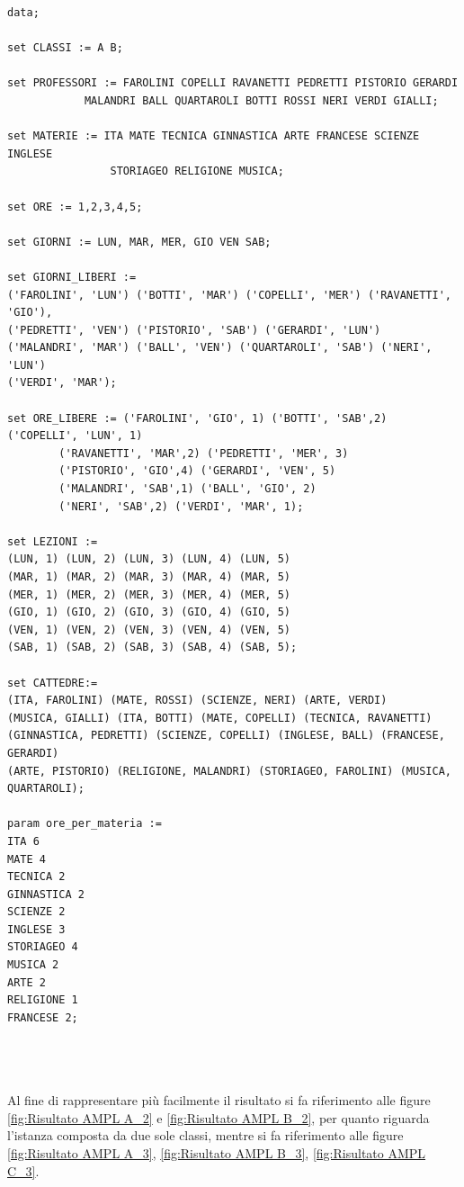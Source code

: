 \documentclass{article}
\begin{document}
\begin{verbatim}
data;

set CLASSI := A B;

set PROFESSORI := FAROLINI COPELLI RAVANETTI PEDRETTI PISTORIO GERARDI 
			MALANDRI BALL QUARTAROLI BOTTI ROSSI NERI VERDI GIALLI;
			
set MATERIE := ITA MATE TECNICA GINNASTICA ARTE FRANCESE SCIENZE INGLESE 
				STORIAGEO RELIGIONE MUSICA;
				
set ORE := 1,2,3,4,5;

set GIORNI := LUN, MAR, MER, GIO VEN SAB;

set GIORNI_LIBERI :=
('FAROLINI', 'LUN') ('BOTTI', 'MAR') ('COPELLI', 'MER') ('RAVANETTI', 'GIO'),
('PEDRETTI', 'VEN') ('PISTORIO', 'SAB') ('GERARDI', 'LUN')
('MALANDRI', 'MAR') ('BALL', 'VEN') ('QUARTAROLI', 'SAB') ('NERI', 'LUN')
('VERDI', 'MAR');

set ORE_LIBERE := ('FAROLINI', 'GIO', 1) ('BOTTI', 'SAB',2) ('COPELLI', 'LUN', 1)
        ('RAVANETTI', 'MAR',2) ('PEDRETTI', 'MER', 3)
        ('PISTORIO', 'GIO',4) ('GERARDI', 'VEN', 5) 
        ('MALANDRI', 'SAB',1) ('BALL', 'GIO', 2) 
        ('NERI', 'SAB',2) ('VERDI', 'MAR', 1);
        
set LEZIONI := 
(LUN, 1) (LUN, 2) (LUN, 3) (LUN, 4) (LUN, 5)
(MAR, 1) (MAR, 2) (MAR, 3) (MAR, 4) (MAR, 5)
(MER, 1) (MER, 2) (MER, 3) (MER, 4) (MER, 5)
(GIO, 1) (GIO, 2) (GIO, 3) (GIO, 4) (GIO, 5)
(VEN, 1) (VEN, 2) (VEN, 3) (VEN, 4) (VEN, 5) 
(SAB, 1) (SAB, 2) (SAB, 3) (SAB, 4) (SAB, 5);

set CATTEDRE:=
(ITA, FAROLINI) (MATE, ROSSI) (SCIENZE, NERI) (ARTE, VERDI)
(MUSICA, GIALLI) (ITA, BOTTI) (MATE, COPELLI) (TECNICA, RAVANETTI)
(GINNASTICA, PEDRETTI) (SCIENZE, COPELLI) (INGLESE, BALL) (FRANCESE, GERARDI)
(ARTE, PISTORIO) (RELIGIONE, MALANDRI) (STORIAGEO, FAROLINI) (MUSICA, QUARTAROLI);

param ore_per_materia :=
ITA 6
MATE 4
TECNICA 2
GINNASTICA 2
SCIENZE 2
INGLESE 3
STORIAGEO 4
MUSICA 2
ARTE 2
RELIGIONE 1
FRANCESE 2;
\end{verbatim}
\\\\\\Al fine di rappresentare più facilmente il risultato si fa riferimento alle figure \ref{fig:Risultato AMPL A_2} e \ref{fig:Risultato AMPL B_2}, per quanto riguarda l'istanza composta da due sole classi, mentre si fa riferimento alle figure \ref{fig:Risultato AMPL A_3}, \ref{fig:Risultato AMPL B_3}, \ref{fig:Risultato AMPL C_3}. 
\end{document}
